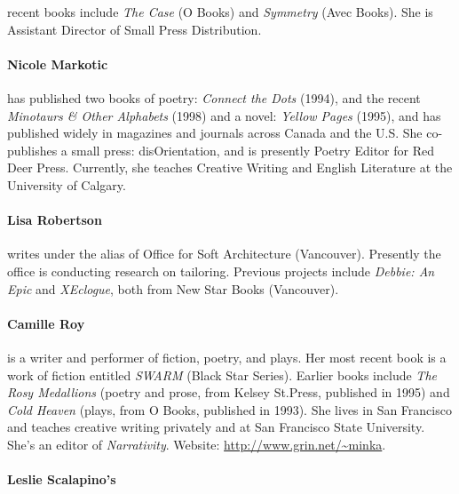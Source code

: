 \documentclass[
]{memoir}
\begin{document}
recent books include \emph{The Case} (O Books) and \emph{Symmetry} (Avec
Books). She is Assistant Director of Small Press Distribution.

\hypertarget{nicole-markotic}{%
\paragraph{Nicole Markotic}\label{nicole-markotic}}

has published two books of poetry: \emph{Connect the Dots} (1994), and
the recent \emph{Minotaurs \& Other Alphabets} (1998) and a novel:
\emph{Yellow Pages} (1995), and has published widely in magazines and
journals across Canada and the U.S. She co-publishes a small press:
disOrientation, and is presently Poetry Editor for Red Deer Press.
Currently, she teaches Creative Writing and English Literature at the
University of Calgary.

\hypertarget{lisa-robertson}{%
\paragraph{Lisa Robertson}\label{lisa-robertson}}

writes under the alias of Office for Soft Architecture (Vancouver).
Presently the office is conducting research on tailoring. Previous
projects include \emph{Debbie: An Epic} and \emph{XEclogue}, both from
New Star Books (Vancouver).

\hypertarget{camille-roy}{%
\paragraph{Camille Roy}\label{camille-roy}}

is a writer and performer of fiction, poetry, and plays. Her most recent
book is a work of fiction entitled \emph{SWARM} (Black Star Series).
Earlier books include \emph{The Rosy Medallions} (poetry and prose, from
Kelsey St.Press, published in 1995) and \emph{Cold Heaven} (plays, from
O Books, published in 1993). She lives in San Francisco and teaches
creative writing privately and at San Francisco State University. She's
an editor of \emph{Narrativity}. Website:
\href{http://www.grin.net/\%7Eminka}{http://www.grin.net/\textasciitilde{}minka}.

\hypertarget{leslie-scalapinos}{%
\paragraph{Leslie Scalapino's}\label{leslie-scalapinos}}
\end{document}
